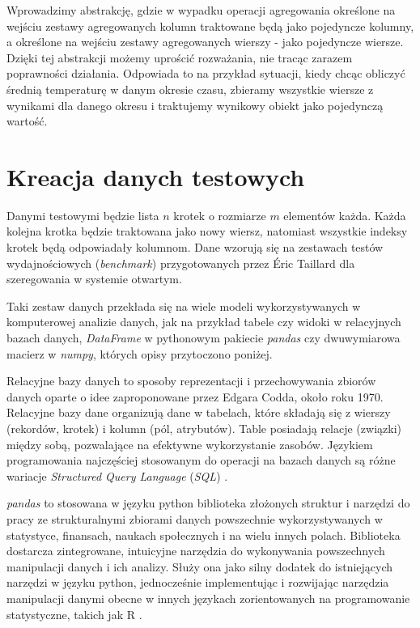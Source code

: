 \documentclass[brudnopis]{xmgr}
\begin{document}
Wprowadzimy abstrakcję, gdzie w wypadku operacji agregowania określone na wejściu zestawy agregowanych kolumn traktowane będą jako pojedyncze kolumny, a określone na wejściu zestawy agregowanych wierszy - jako pojedyncze wiersze. Dzięki tej abstrakcji możemy uprościć rozważania, nie tracąc zarazem poprawności działania. Odpowiada to na przykład sytuacji, kiedy chcąc obliczyć średnią temperaturę w danym okresie czasu, zbieramy wszystkie wiersze z wynikami dla danego okresu i traktujemy wynikowy obiekt jako pojedynczą wartość.

\section{Kreacja danych testowych}

Danymi testowymi będzie lista $n$ krotek o rozmiarze $m$ elementów każda.
Każda kolejna krotka będzie traktowana jako nowy wiersz, natomiast wszystkie indeksy krotek będą odpowiadały kolumnom. Dane wzorują się na zestawach testów wydajnościowych (\emph{benchmark}) przygotowanych przez Éric Taillard \cite{taillard1993benchmarks} dla szeregowania w systemie otwartym.
\medskip

Taki zestaw danych przekłada się na wiele modeli wykorzystywanych w komputerowej analizie danych, jak na przykład tabele czy widoki w relacyjnych bazach danych, \emph{DataFrame} w pythonowym pakiecie \emph{pandas} czy dwuwymiarowa macierz w \emph{numpy}, których opisy przytoczono poniżej.
\medskip

Relacyjne bazy danych to sposoby reprezentacji i przechowywania zbiorów danych oparte o idee zaproponowane przez Edgara Codda, około roku 1970. Relacyjne bazy dane organizują dane w tabelach, które składają się z wierszy (rekordów, krotek) i kolumn (pól, atrybutów). Table posiadają relacje (związki) między sobą, pozwalające na efektywne wykorzystanie zasobów. Językiem programowania najczęściej stosowanym do operacji na bazach danych są różne wariacje \emph{Structured Query Language} (\emph{SQL}) \cite{RDB1:2020:X} \cite{RDB2:2020:X} \cite{RDB3:2010:X}.
\medskip

\emph{pandas} to stosowana w języku python biblioteka złożonych struktur i narzędzi do pracy ze strukturalnymi zbiorami danych powszechnie wykorzystywanych w statystyce, finansach, naukach społecznych i na wielu innych polach. Biblioteka dostarcza zintegrowane, intuicyjne narzędzia do wykonywania powszechnych manipulacji danych i ich analizy. Służy ona jako silny dodatek do istniejących narzędzi w języku python, jednocześnie implementując i rozwijając narzędzia manipulacji danymi obecne w innych językach zorientowanych na programowanie statystyczne, takich jak R \cite{PANDAS1:2011:X} \cite{PANDAS2:2020:X}.
\medskip
\end{document}
